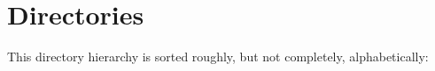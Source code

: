 \section{Directories}
This directory hierarchy is sorted roughly, but not completely, alphabetically:\begin{DoxyCompactList}
\item {}
\end{DoxyCompactList}
